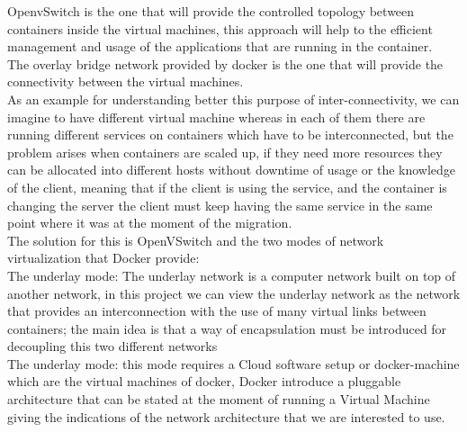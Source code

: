 OpenvSwitch is the one that will provide the controlled topology between containers inside the virtual machines, this approach will help to the efficient management and usage of the applications that are running in the container.\\ 

The overlay bridge network provided by docker is the one that will provide the connectivity between the virtual machines.\\

As an example for understanding better this purpose of inter-connectivity, we can imagine to have different virtual machine whereas in each of them there are running different services on containers which have to be interconnected, but the problem arises when containers are scaled up, if they need more resources they can be allocated into different hosts without downtime of usage or the knowledge of the client, meaning that if the client is using the service, and the container is changing the server the client must keep having the same service in the same point where it was at the moment of the migration. \\

The solution for this is OpenVSwitch and the two modes of network virtualization that Docker provide: \\

The underlay mode: The underlay network is a computer network built on top of another network, in this project we can view the underlay network as the network that provides an interconnection with the use of many virtual links between containers; the main idea is that a way of encapsulation must be introduced for decoupling this two different networks \\

The underlay mode: this mode requires a Cloud software setup or docker-machine which are the virtual machines of docker, Docker introduce a pluggable architecture that can be stated at the moment of running a Virtual Machine giving the indications of the network architecture that we are interested to use. \\